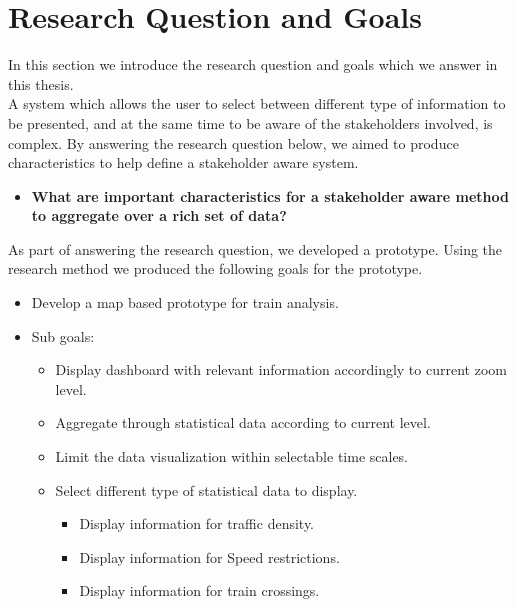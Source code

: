 
\section{Research Question and Goals} %
\label{sec:intro_research_question}
In this section we introduce the research question and goals which we 
answer in this thesis.\\

A system which allows the user to select between different type of information
to be presented, and at the same time to be aware of the stakeholders 
involved, is complex. By answering the research question
below, we aimed to produce characteristics to help define a
stakeholder aware system.\\

\begin{itemize}
	\item \textbf{What are important characteristics for a stakeholder aware 
	method to aggregate over a rich set of data?}
\end{itemize}

As part of answering the research question, we developed a prototype. Using the
research method we produced the following goals for the prototype.

\begin{itemize}
	\item Develop a map based prototype for train analysis.
	\item Sub goals:
	\begin{itemize}
		\item Display dashboard with relevant information accordingly to 
		current zoom level.
		\item Aggregate through statistical data according to current level.
		\item Limit the data visualization within selectable time scales.
		\item Select different type of statistical data to display.
		\begin{itemize}
			\item Display information for traffic density.
			\item Display information for Speed restrictions.
			\item Display information for train crossings.
		\end{itemize}
	\end{itemize}
\end{itemize}

